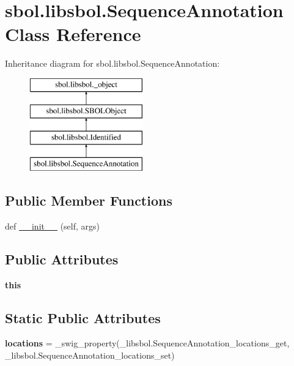 \hypertarget{classsbol_1_1libsbol_1_1_sequence_annotation}{}\section{sbol.\+libsbol.\+Sequence\+Annotation Class Reference}
\label{classsbol_1_1libsbol_1_1_sequence_annotation}
Inheritance diagram for sbol.\+libsbol.\+Sequence\+Annotation\+:\begin{figure}[H]
\begin{center}
\leavevmode
\includegraphics[height=4.000000cm]{classsbol_1_1libsbol_1_1_sequence_annotation}
\end{center}
\end{figure}
\subsection*{Public Member Functions}
\begin{DoxyCompactItemize}
\item 
def \hyperlink{classsbol_1_1libsbol_1_1_sequence_annotation_a9db7889cd3ee1aecb49ed913557d0631}{\+\_\+\+\_\+init\+\_\+\+\_\+} (self, args)
\end{DoxyCompactItemize}
\subsection*{Public Attributes}
\begin{DoxyCompactItemize}
\item 
{\bfseries this}\hypertarget{classsbol_1_1libsbol_1_1_sequence_annotation_a3db1cb1feca5848509cee7e39cee9d4d}{}\label{classsbol_1_1libsbol_1_1_sequence_annotation_a3db1cb1feca5848509cee7e39cee9d4d}

\end{DoxyCompactItemize}
\subsection*{Static Public Attributes}
\begin{DoxyCompactItemize}
\item 
{\bfseries locations} = \+\_\+swig\+\_\+property(\+\_\+libsbol.\+Sequence\+Annotation\+\_\+locations\+\_\+get, \+\_\+libsbol.\+Sequence\+Annotation\+\_\+locations\+\_\+set)\hypertarget{classsbol_1_1libsbol_1_1_sequence_annotation_a4f4742a70a4c391f547f5ad02faeb825}{}\label{classsbol_1_1libsbol_1_1_sequence_annotation_a4f4742a70a4c391f547f5ad02faeb825}

\end{DoxyCompactItemize}


